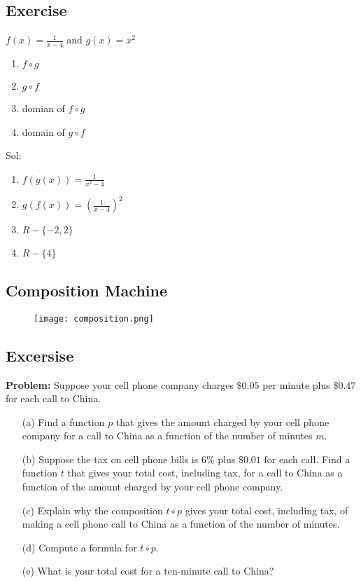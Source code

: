 \subsection{Exercise}
\( f(x) = \frac{1}{x-4} \) and \( g(x) = x^{2} \)
\begin{enumerate}
  \item \(f \circ g \)
  \item \( g \circ f \)
  \item domian of \(f \circ g \)
  \item domain of \( g \circ f \)
\end{enumerate}
Sol:
\begin{enumerate}
  \item  \(f(g(x)) = \frac{1}{x^{2} - 4}\)
  \item \(g(f(x)) = (\frac{1}{x-4})^{2}\)
  \item \(R - \{-2,2\} \)
  \item \(R - \{4\} \)
\end{enumerate}

\subsection{Composition Machine}
\begin{figure}
  \centering
  \texttt{[image: composition.png]}
\end{figure}

\subsection{Excersise}
\textbf{Problem:} Suppose your cell phone company charges \(\$0.05\) per minute plus \(\$0.47\) for each call to China.
\begin{enumerate}
  \item[(a)] Find a function \(p\) that gives the amount charged by your cell phone company for a call to China as a function of the number of minutes \(m\).
  \item[(b)] Suppose the tax on cell phone bills is 6\% plus \(\$0.01\) for each call. Find a function \(t\) that gives your total cost, including tax, for a call to China as a function of the amount charged by your cell phone company.
  \item[(c)] Explain why the composition \(t \circ p\) gives your total cost, including tax, of making a cell phone call to China as a function of the number of minutes.
  \item[(d)] Compute a formula for \(t \circ p\).
  \item[(e)] What is your total cost for a ten-minute call to China?
\end{enumerate}

